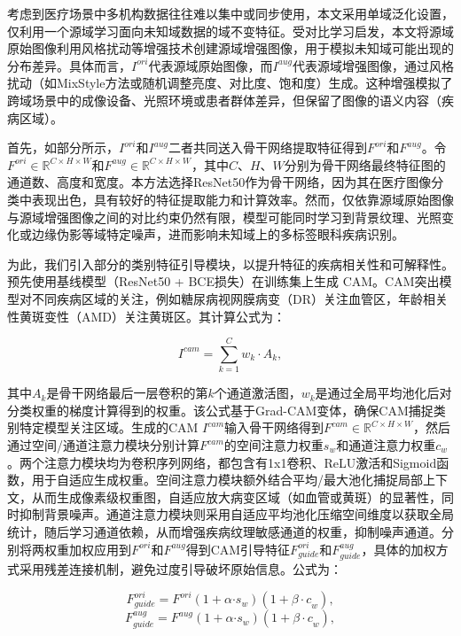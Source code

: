 
考虑到医疗场景中多机构数据往往难以集中或同步使用，本文采用单域泛化设置，仅利用一个源域学习面向未知域数据的域不变特征。受对比学习启发，本文将源域原始图像利用风格扰动等增强技术创建源域增强图像，用于模拟未知域可能出现的分布差异。具体而言，\(I^{ori}\)代表源域原始图像，而\(I^{aug}\)代表源域增强图像，通过风格扰动（如MixStyle方法或随机调整亮度、对比度、饱和度）生成。这种增强模拟了跨域场景中的成像设备、光照环境或患者群体差异，但保留了图像的语义内容（疾病区域）。

首先，如部分所示，\(I^{ori}\)和\(I^{aug}\)二者共同送入骨干网络提取特征得到\(F^{ori}\)和\(F^{aug}\)。令\(F^{ori} \in \mathbb{R}^{C \times H \times W}\)和\(F^{aug} \in \mathbb{R}^{C \times H \times W}\)，其中\(C\)、\(H\)、\(W\)分别为骨干网络最终特征图的通道数、高度和宽度。本方法选择ResNet50作为骨干网络，因为其在医疗图像分类中表现出色，具有较好的特征提取能力和计算效率。然而，仅依靠源域原始图像与源域增强图像之间的对比约束仍然有限，模型可能同时学习到背景纹理、光照变化或边缘伪影等域特定噪声，进而影响未知域上的多标签眼科疾病识别。

为此，我们引入部分的类别特征引导模块，以提升特征的疾病相关性和可解释性。预先使用基线模型（ResNet50 + BCE损失）在训练集上生成 CAM。CAM突出模型对不同疾病区域的关注，例如糖尿病视网膜病变（DR）关注血管区，年龄相关性黄斑变性（AMD）关注黄斑区。其计算公式为：

\[I^{cam} = \sum_{k = 1}^{C}w_{k} \cdot A_{k},
\]

其中\(A_{k}\)是骨干网络最后一层卷积的第\(k\)个通道激活图，\(w_{k}\)是通过全局平均池化后对分类权重的梯度计算得到的权重。该公式基于Grad-CAM变体，确保CAM捕捉类别特定模型关注区域。生成的CAM \(I^{cam}\)输入骨干网络得到\(F^{cam} \in \mathbb{R}^{C \times H \times W}\)，然后通过空间/通道注意力模块分别计算\(F^{cam}\)的空间注意力权重\(s_{w}\)和通道注意力权重\(c_{w}\)。两个注意力模块均为卷积序列网络，都包含有1x1卷积、ReLU激活和Sigmoid函数，用于自适应生成权重。空间注意力模块额外结合平均/最大池化捕捉局部上下文，从而生成像素级权重图，自适应放大病变区域（如血管或黄斑）的显著性，同时抑制背景噪声。通道注意力模块则采用自适应平均池化压缩空间维度以获取全局统计，随后学习通道依赖，从而增强疾病纹理敏感通道的权重，抑制噪声通道。分别将两权重加权应用到\(F^{ori}\)和\(F^{aug}\)得到CAM引导特征\(F_{guide}^{ori}\)和\(F_{guide}^{aug}\)，具体的加权方式采用残差连接机制，避免过度引导破坏原始信息。公式为：

\[F_{guide}^{ori} = F^{ori}(1 + \alpha{\cdot s}_{w})(1 + {\beta \cdot c}_{w}),
\]\[F_{guide}^{aug} = F^{aug}(1 + \alpha{\cdot s}_{w})(1 + {\beta \cdot c}_{w}),\]

